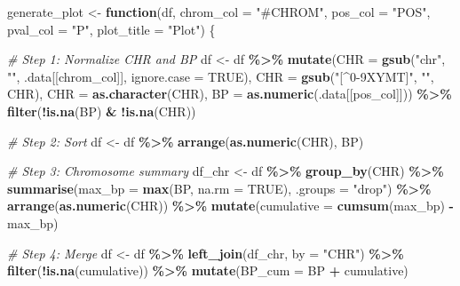 \documentclass[
  12pt,
]{article}
\newenvironment{Shaded}{\begin{snugshade}}{\end{snugshade}}
\newcommand{\AttributeTok}[1]{\textcolor[rgb]{0.13,0.29,0.53}{#1}}
\newcommand{\CommentTok}[1]{\textcolor[rgb]{0.56,0.35,0.01}{\textit{#1}}}
\newcommand{\ConstantTok}[1]{\textcolor[rgb]{0.56,0.35,0.01}{#1}}
\newcommand{\ControlFlowTok}[1]{\textcolor[rgb]{0.13,0.29,0.53}{\textbf{#1}}}
\newcommand{\FunctionTok}[1]{\textcolor[rgb]{0.13,0.29,0.53}{\textbf{#1}}}
\newcommand{\NormalTok}[1]{#1}
\newcommand{\OtherTok}[1]{\textcolor[rgb]{0.56,0.35,0.01}{#1}}
\newcommand{\SpecialCharTok}[1]{\textcolor[rgb]{0.81,0.36,0.00}{\textbf{#1}}}
\newcommand{\StringTok}[1]{\textcolor[rgb]{0.31,0.60,0.02}{#1}}
\begin{document}
\begin{Shaded}
\begin{Highlighting}[]
\NormalTok{generate\_plot }\OtherTok{\textless{}{-}} \ControlFlowTok{function}\NormalTok{(df, }
                                    \AttributeTok{chrom\_col =} \StringTok{"\#CHROM"}\NormalTok{, }
                                    \AttributeTok{pos\_col =} \StringTok{"POS"}\NormalTok{, }
                                    \AttributeTok{pval\_col =} \StringTok{"P"}\NormalTok{, }
                                    \AttributeTok{plot\_title =} \StringTok{"Plot"}\NormalTok{) \{}

  \CommentTok{\# Step 1: Normalize CHR and BP}
\NormalTok{  df }\OtherTok{\textless{}{-}}\NormalTok{ df }\SpecialCharTok{\%\textgreater{}\%}
    \FunctionTok{mutate}\NormalTok{(}\AttributeTok{CHR =} \FunctionTok{gsub}\NormalTok{(}\StringTok{"chr"}\NormalTok{, }\StringTok{""}\NormalTok{, .data[[chrom\_col]], }\AttributeTok{ignore.case =} \ConstantTok{TRUE}\NormalTok{),}
           \AttributeTok{CHR =} \FunctionTok{gsub}\NormalTok{(}\StringTok{"[\^{}0{-}9XYMT]"}\NormalTok{, }\StringTok{""}\NormalTok{, CHR),}
           \AttributeTok{CHR =} \FunctionTok{as.character}\NormalTok{(CHR),}
           \AttributeTok{BP =} \FunctionTok{as.numeric}\NormalTok{(.data[[pos\_col]])) }\SpecialCharTok{\%\textgreater{}\%}
    \FunctionTok{filter}\NormalTok{(}\SpecialCharTok{!}\FunctionTok{is.na}\NormalTok{(BP) }\SpecialCharTok{\&} \SpecialCharTok{!}\FunctionTok{is.na}\NormalTok{(CHR))}

  \CommentTok{\# Step 2: Sort}
\NormalTok{  df }\OtherTok{\textless{}{-}}\NormalTok{ df }\SpecialCharTok{\%\textgreater{}\%} \FunctionTok{arrange}\NormalTok{(}\FunctionTok{as.numeric}\NormalTok{(CHR), BP)}

  \CommentTok{\# Step 3: Chromosome summary}
\NormalTok{  df\_chr }\OtherTok{\textless{}{-}}\NormalTok{ df }\SpecialCharTok{\%\textgreater{}\%}
    \FunctionTok{group\_by}\NormalTok{(CHR) }\SpecialCharTok{\%\textgreater{}\%}
    \FunctionTok{summarise}\NormalTok{(}\AttributeTok{max\_bp =} \FunctionTok{max}\NormalTok{(BP, }\AttributeTok{na.rm =} \ConstantTok{TRUE}\NormalTok{), }\AttributeTok{.groups =} \StringTok{"drop"}\NormalTok{) }\SpecialCharTok{\%\textgreater{}\%}
    \FunctionTok{arrange}\NormalTok{(}\FunctionTok{as.numeric}\NormalTok{(CHR)) }\SpecialCharTok{\%\textgreater{}\%}
    \FunctionTok{mutate}\NormalTok{(}\AttributeTok{cumulative =} \FunctionTok{cumsum}\NormalTok{(max\_bp) }\SpecialCharTok{{-}}\NormalTok{ max\_bp)}

  \CommentTok{\# Step 4: Merge}
\NormalTok{  df }\OtherTok{\textless{}{-}}\NormalTok{ df }\SpecialCharTok{\%\textgreater{}\%}
    \FunctionTok{left\_join}\NormalTok{(df\_chr, }\AttributeTok{by =} \StringTok{"CHR"}\NormalTok{) }\SpecialCharTok{\%\textgreater{}\%}
    \FunctionTok{filter}\NormalTok{(}\SpecialCharTok{!}\FunctionTok{is.na}\NormalTok{(cumulative)) }\SpecialCharTok{\%\textgreater{}\%}
    \FunctionTok{mutate}\NormalTok{(}\AttributeTok{BP\_cum =}\NormalTok{ BP }\SpecialCharTok{+}\NormalTok{ cumulative)}


\end{Highlighting}
\end{Shaded}
\end{document}
